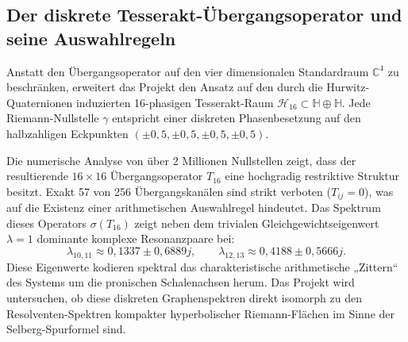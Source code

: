 \documentclass[11pt,a4paper,bibliography=totoc]{scrartcl}
\begin{document}
	\subsection{Der diskrete Tesserakt-Übergangsoperator und seine Auswahlregeln}
	Anstatt den Übergangsoperator auf den vier dimensionalen Standardraum $\mathbb{C}^4$ zu beschränken, erweitert das Projekt den Ansatz auf den durch die Hurwitz-Quaternionen induzierten 16-phasigen Tesserakt-Raum $\mathcal{H}_{16} \subset \mathbb{H} \oplus \mathbb{H}$. Jede Riemann-Nullstelle $\gamma$ entspricht einer diskreten Phasenbesetzung auf den halbzahligen Eckpunkten $(\pm 0{,}5, \pm 0{,}5, \pm 0{,}5, \pm 0{,}5)$.
	
	Die numerische Analyse von über 2 Millionen Nullstellen zeigt, dass der resultierende $16 \times 16$ Übergangsoperator $T_{16}$ eine hochgradig restriktive Struktur besitzt. Exakt 57 von 256 Übergangskanälen sind strikt verboten ($T_{ij} = 0$), was auf die Existenz einer arithmetischen Auswahlregel hindeutet. Das Spektrum dieses Operators $\sigma(T_{16})$ zeigt neben dem trivialen Gleichgewichtseigenwert $\lambda = 1$ dominante komplexe Resonanzpaare bei:
	\[
	\lambda_{10,11} \approx 0{,}1337 \pm 0{,}6889j, \qquad \lambda_{12,13} \approx 0{,}4188 \pm 0{,}5666j.
	\]
	Diese Eigenwerte kodieren spektral das charakteristische arithmetische „Zittern“ des Systems um die pronischen Schalenachsen herum. Das Projekt wird untersuchen, ob diese diskreten Graphenspektren direkt isomorph zu den Resolventen-Spektren kompakter hyperbolischer Riemann-Flächen im Sinne der Selberg-Spurformel sind.
\end{document}
